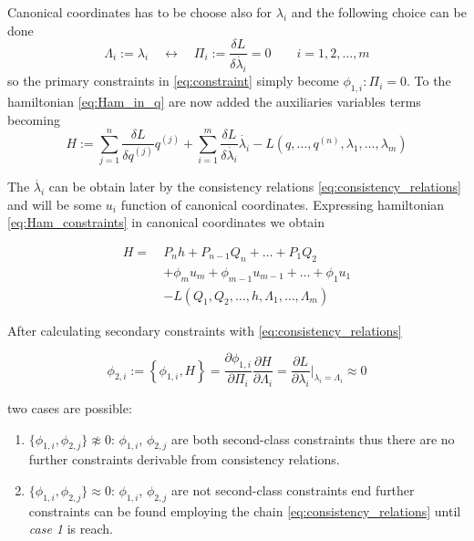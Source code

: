 Canonical coordinates has to be choose also for $\lambda_i$ and the following
choice can be done
\begin{equation} \label{eq:def_canonical_coordinates_lambda}
  \Lambda_{i}:= \lambda_{i}
  \quad \leftrightarrow \quad
  \Pi_{i} := \frac{\delta L}{\delta \dot{\lambda_{i}}} = 0
  \qquad i = 1, 2, \ldots, m
\end{equation}
so the primary constraints in \eqref{eq:constraint} simply become
$\phi_{1, i}: \Pi_i = 0$. To the hamiltonian \eqref{eq:Ham_in_q} are now added
the auxiliaries variables terms becoming
\begin{equation} \label{eq:Ham_constraints_in_q}
  H :=
  \sum_{j=1}^{n} \frac{\delta L}{\delta q^{(j)}} q^{(j)} +
  \sum_{i=1}^{m} \frac{\delta L}{\delta \dot{\lambda_i}} \dot{\lambda_i} -
  L(q, \ldots, q^{(n)}, \lambda_1, \ldots, \lambda_m)
\end{equation}

The $\dot{\lambda_i}$ can be obtain later by the consistency relations
\eqref{eq:consistency_relations} and will be some $u_i$ function of canonical
coordinates. Expressing hamiltonian \eqref{eq:Ham_constraints} in canonical
coordinates we obtain

\begin{align} \label{eq:Ham_constraints}
  H =\ & P_n h + P_{n-1} Q_n + \ldots + P_1 Q_2 \nonumber \\
       & + \phi_m u_m + \phi_{m-1} u_{m-1} + \ldots + \phi_1 u_1 \nonumber \\
       & - L ( Q_1, Q_2, \ldots, h, \Lambda_1, \ldots, \Lambda_m)
\end{align}


After calculating secondary constraints with \eqref{eq:consistency_relations}

\begin{equation*}
  \phi_{2, i} := \left\{ \phi_{1,i}, H \right\} =
  \frac{\partial \phi_{1,i}}{\partial \Pi_i}
  \frac{\partial H}{\partial \Lambda_i} =
  \frac{\partial L}{\partial \lambda_i} \Big|_{\lambda_i = \Lambda_i}
  \approx 0
\end{equation*}

two cases are possible:

\begin{enumerate}
  \item $\{\phi_{1,i}, \phi_{2,j}\} \napprox 0$: $\phi_{1,i}$, $\phi_{2,j}$ are
    both second-class constraints thus there are no further constraints
    derivable from consistency relations.
  \item $\{\phi_{1,i}, \phi_{2,j}\} \approx 0$: $\phi_{1,i}$, $\phi_{2,j}$ are
    not second-class constraints end further constraints can be found employing
    the chain \eqref{eq:consistency_relations} until \emph{case 1} is reach.
\end{enumerate}

